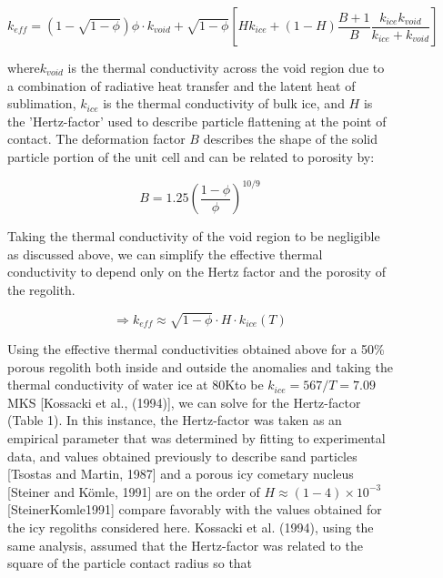 \documentclass[11pt]{article} %
\begin{document}
\begin{figure}[ht]
\begin{Table}
	\begin{equation}
	k_{eff} = \left(1-\sqrt{1-\phi} \right)\phi \cdot k_{void} + \sqrt{1-\phi}\left[ H k_{ice}+(1 - H)\frac{B+1}{B}\frac{k_{ice}k_{void}}{k_{ice}+k_{void}} \right]
	\end{equation}
	
	where$k_{void}$ is the thermal conductivity across the void region due to a combination of radiative heat transfer and the latent heat of sublimation, $k_{ice}$ is the thermal conductivity of bulk ice, and $H$ is the 'Hertz-factor' used to describe particle flattening at the point of contact. The deformation factor $B$ describes the shape of the solid particle portion of the unit cell and can be related to porosity by:
	
	\begin{equation}
	B = 1.25 ( \frac{1-\phi}{\phi} )^{10/9}
	\end{equation}
	

	Taking the thermal conductivity of the void region to be negligible as discussed above, we can simplify the effective thermal conductivity to depend only on the Hertz factor and the porosity of the regolith.
	
	\begin{equation}\label{eq:unitcell}
	\Rightarrow k_{eff} \approx \sqrt{1-\phi}\cdot H \cdot k_{ice}(T)
	\end{equation}
	
	 Using the effective thermal conductivities obtained above for a 50\% porous regolith both inside and outside the anomalies and taking the thermal conductivity of water ice at 80Kto be $k_{ice} = 567/T = 7.09$ MKS [Kossacki et al., (1994)], we can solve for the Hertz-factor (Table 1). In this instance, the Hertz-factor was taken as an empirical parameter that was determined by fitting to experimental data, and values obtained previously to describe sand particles [Tsostas and Martin, 1987] and a porous icy cometary nucleus [Steiner and K\"{o}mle, 1991] are on the order of  $H  \approx (1 - 4) \times10^{-3}$ [SteinerKomle1991] compare favorably with the values obtained for the icy regoliths considered here. Kossacki et al. (1994), using the same analysis, assumed that the Hertz-factor was related to the square of the particle contact radius so that
	

\end{Table}
\end{figure}
\end{document}
